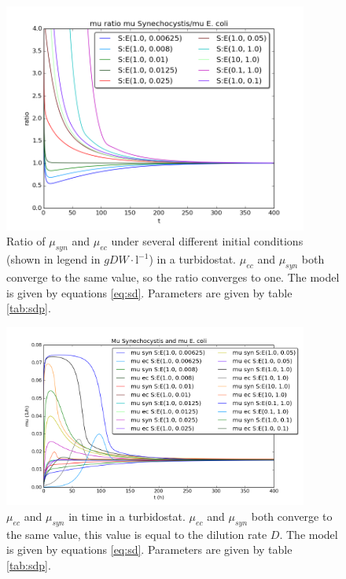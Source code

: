 \documentclass[12pt]{report}
\begin{document}
\begin{figure}[!ht]
 \begin{center}  
     \includegraphics[width=10cm]{sub_dependent_turbidostat_muratio.png}
     \caption{Ratio of $\mu_{syn}$ and $\mu_{ec}$ under several different initial conditions (shown in legend in $gDW\cdot \text{l}^{-1}$) in a turbidostat. $\mu_{ec}$ and $\mu_{syn}$ both converge to the same value, so the ratio converges to one. The model is given by equations \ref{eq:sd}. Parameters are given by table \ref{tab:sdp}.}
    \label{fig:submratturb}
    \end{center}
\end{figure}

\begin{figure}[!ht] 
 \begin{center}  
     \includegraphics[width=10cm]{sub_dependent_turbidostat_mus.png}
     \caption{$\mu_{ec}$ and $\mu_{syn}$ in time in a turbidostat. $\mu_{ec}$ and $\mu_{syn}$ both converge to the same value, this value is equal to the dilution rate $D$. The model is given by equations \ref{eq:sd}. Parameters are given by table \ref{tab:sdp}.}
    \label{fig:submusratturb}
    \end{center}
\end{figure}
\end{document}
